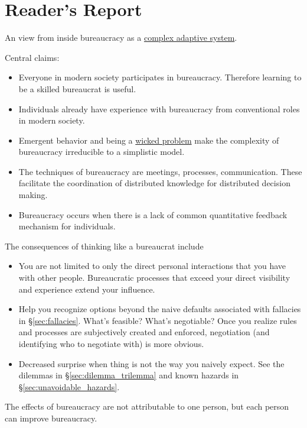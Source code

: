 \section{Reader's Report\label{sec:reader_report}}
An view from inside bureaucracy as a \href{https://en.wikipedia.org/wiki/Complexity_theory_and_organizations}{complex adaptive system}. 

Central claims:
\begin{itemize}
    \item Everyone in modern society participates in bureaucracy. Therefore learning to be a skilled bureaucrat is useful.
    \item Individuals already have experience with bureaucracy from conventional roles in modern society. 
    \item Emergent behavior and being a \href{https://en.wikipedia.org/wiki/Wicked_problem}{wicked problem} make the complexity of bureaucracy irreducible to a simplistic model.
    \item The techniques of bureaucracy are meetings, processes, communication. These facilitate the coordination of distributed knowledge for distributed decision making.  
    \item Bureaucracy occurs when there is a lack of common quantitative feedback mechanism for individuals.
\end{itemize}
The consequences of thinking like a bureaucrat include
\begin{itemize}
    \item You are not limited to only the direct personal interactions that you have with other people. Bureaucratic processes that exceed your direct visibility and experience extend your influence.
    \item Help you recognize options beyond the naive defaults associated with fallacies in \S\ref{sec:fallacies}. What's feasible? What's negotiable? Once you realize rules and processes are subjectively created and enforced, negotiation (and identifying who to negotiate with) is more obvious.
    \item Decreased surprise when thing is not the way you naively expect. See the dilemmas in \S\ref{sec:dilemma_trilemma} and known hazards in \S\ref{sec:unavoidable_hazards}.
\end{itemize}


The effects of bureaucracy are not attributable to one person, but each person can improve bureaucracy.